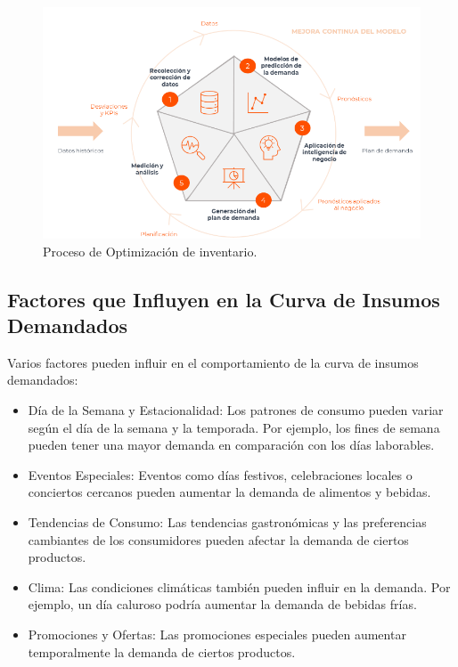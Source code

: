\begin{figure}[H]
  \begin{center}
    \includegraphics[scale=0.90]{./procesos_de_trabajo.png}
    \caption{Proceso de Optimización de inventario\cite{decide}.}
    \label{fig:proceso_inventario}
  \end{center}
\end{figure}

\subsection{Factores que Influyen en la Curva de Insumos Demandados}

Varios factores pueden influir en el comportamiento de la curva de insumos demandados:

\begin{itemize}
    \item Día de la Semana y Estacionalidad: Los patrones de consumo pueden variar según el día de la semana y la temporada. Por ejemplo, los fines de semana pueden tener una mayor demanda en comparación con los días laborables.
    
    \item Eventos Especiales: Eventos como días festivos, celebraciones locales o conciertos cercanos pueden aumentar la demanda de alimentos y bebidas.
    
    \item Tendencias de Consumo: Las tendencias gastronómicas y las preferencias cambiantes de los consumidores pueden afectar la demanda de ciertos productos.
    
    \item Clima: Las condiciones climáticas también pueden influir en la demanda. Por ejemplo, un día caluroso podría aumentar la demanda de bebidas frías.
    
    \item Promociones y Ofertas: Las promociones especiales pueden aumentar temporalmente la demanda de ciertos productos.
\end{itemize}

